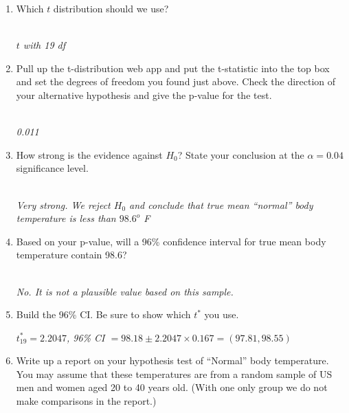 \begin{enumerate}
\item Which $t$ distribution should we use?
\begin{students}
  \vspace{1cm}
\end{students}
\begin{key}
\\ {\it $t$ with 19 df}
\end{key}



\item Pull up the t-distribution web app and put the t-statistic into
  the top box and set the degrees of freedom you found just
  above. Check the direction of your alternative hypothesis and give
  the p-value for the test.
\begin{students}
  \vspace{1cm}
\end{students}
\begin{key}
\\ {\it 0.011}
\end{key}
\item  How strong is the evidence against $H_0$?  State your
  conclusion at the $\alpha = 0.04$ significance level.
\begin{students}
  \vspace{1cm}
\end{students}
\begin{key}
\\ {\it Very strong. We reject $H_0$ and conclude that true mean
  ``normal'' body temperature is less than $98.6^o$ F}
\end{key}

\item Based on your p-value, will a 96\% confidence interval for true
  mean body temperature contain 98.6?
\begin{students}
  \vspace{1cm}
\end{students}
\begin{key}
\\ {\it No. It is not a plausible value based on this sample.}
\end{key}

\item Build the 96\% CI.  Be sure to show which $t^*$ you use.
\begin{students}
  \vspace{1cm}
\end{students}
\begin{key}
 {\it $t^*_{19} = 2.2047$, 96\% CI $= 98.18 \pm 2.2047 \times 0.167 =
   (97.81, 98.55)$} 
\end{key}

\item Write up a report on  your hypothesis test of ``Normal'' body
  temperature.  You 
  may assume that these temperatures are from a random sample of US
  men and women aged 20 to 40 years old. (With one only group we do not make
  comparisons in the report.)
\begin{students}
  \newpage
\end{students}
\end{enumerate}



